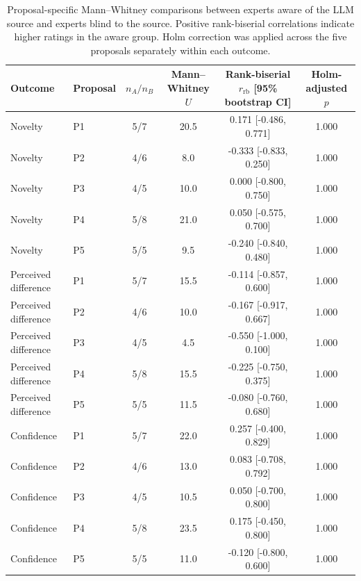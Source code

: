 \begin{table}[htbp]
\caption{Proposal-specific Mann--Whitney comparisons between experts aware of the LLM source and experts blind to the source. Positive rank-biserial correlations indicate higher ratings in the aware group. Holm correction was applied across the five proposals separately within each outcome.}
\label{tab:aware_blind_proposal_comparisons}
\begin{tabular}{llcccc}
\toprule
Outcome & Proposal & $n_A/n_B$ & Mann--Whitney $U$ & Rank-biserial $r_{\mathrm{rb}}$ [95\% bootstrap CI] & Holm-adjusted $p$ \\
\midrule
Novelty & P1 & 5/7 & 20.5 & 0.171 [-0.486, 0.771] & 1.000 \\
Novelty & P2 & 4/6 & 8.0 & -0.333 [-0.833, 0.250] & 1.000 \\
Novelty & P3 & 4/5 & 10.0 & 0.000 [-0.800, 0.750] & 1.000 \\
Novelty & P4 & 5/8 & 21.0 & 0.050 [-0.575, 0.700] & 1.000 \\
Novelty & P5 & 5/5 & 9.5 & -0.240 [-0.840, 0.480] & 1.000 \\
Perceived difference & P1 & 5/7 & 15.5 & -0.114 [-0.857, 0.600] & 1.000 \\
Perceived difference & P2 & 4/6 & 10.0 & -0.167 [-0.917, 0.667] & 1.000 \\
Perceived difference & P3 & 4/5 & 4.5 & -0.550 [-1.000, 0.100] & 1.000 \\
Perceived difference & P4 & 5/8 & 15.5 & -0.225 [-0.750, 0.375] & 1.000 \\
Perceived difference & P5 & 5/5 & 11.5 & -0.080 [-0.760, 0.680] & 1.000 \\
Confidence & P1 & 5/7 & 22.0 & 0.257 [-0.400, 0.829] & 1.000 \\
Confidence & P2 & 4/6 & 13.0 & 0.083 [-0.708, 0.792] & 1.000 \\
Confidence & P3 & 4/5 & 10.5 & 0.050 [-0.700, 0.800] & 1.000 \\
Confidence & P4 & 5/8 & 23.5 & 0.175 [-0.450, 0.800] & 1.000 \\
Confidence & P5 & 5/5 & 11.0 & -0.120 [-0.800, 0.600] & 1.000 \\
\bottomrule
\end{tabular}
\end{table}
